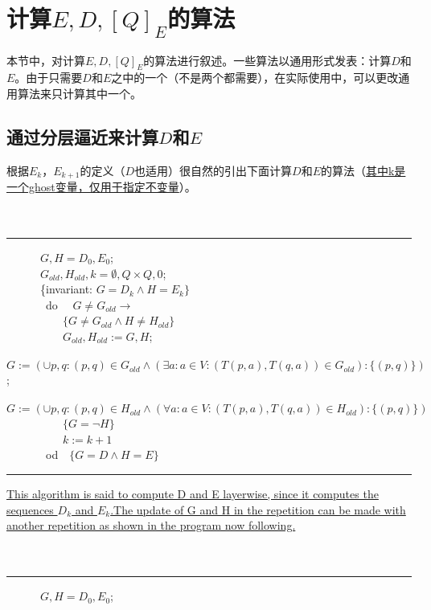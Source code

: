 
\section{计算$E,D,[Q]_E$的算法}
本节中，对计算$E,D,[Q]_E$的算法进行叙述。一些算法以通用形式发表：计算$D$和$E$。由于只需要$D$和$E$之中的一个（不是两个都需要），在实际使用中，可以更改通用算法来只计算其中一个。

\subsection{通过分层逼近来计算$D$和$E$}

根据$E_k$，$E_{k+1}$的定义（$D$也适用）很自然的引出下面计算$D$和$E$的算法（\uline{其中k是一个ghost变量，仅用于指定不变量}）。
\\
\\
\\
\rule{\textwidth}{1pt}
\mbox{　　　}$G,H=D_0,E_0$;\\
\mbox{　　　}$G_{old},H_{old},k=\emptyset ,Q \times Q,0$;\\
\mbox{　　　\{invariant:} $G=D_k \land H =E_k \}$\\
\mbox{　　　 do　} $G \not= G_{old} \longrightarrow$ \\
\mbox{　　　　　}$\{G \not= G_{old} \land H \not= H_{old} \}$ \\
\mbox{　　　　　}$G_{old},H_{old}:=G,H$;\\
\mbox{　　　　　}$G:=(\cup p,q:(p,q)\in G_{old}\land (\exists a:a \in V : (T(p,a),T(q,a))\in G_{old} ) : \{(p,q)\})$; \\
\mbox{　　　　　}$G:=(\cup p,q:(p,q)\in H_{old}\land (\forall a:a \in V : (T(p,a),T(q,a))\in H_{old} ) : \{(p,q)\})$ \\
\mbox{　　　　　}$\{G=\neg H\}$ \\
\mbox{　　　　　}$k:=k+1$ \\
\mbox{　　　 od　}$ \{ G=D \land H=E \}$ \\
\rule{\textwidth}{1pt}
\uline{This algorithm is said to compute D and E layerwise, since it computes the sequences $D_k$ and $E_k$.The update of G and H in the repetition can be made with another repetition as shown in the program now following.}
\\
\\
\\
\rule{\textwidth}{1pt}
\mbox{　　　}$G,H=D_0,E_0$;\\
